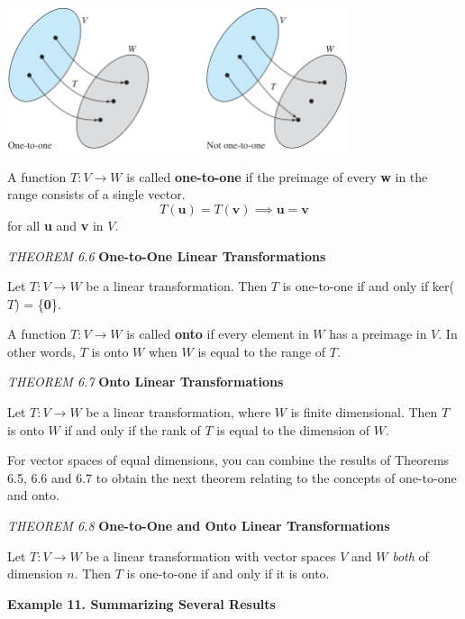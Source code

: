 \documentclass{article}
\begin{document}
    \begin{minipage}{0.61\linewidth}
            \includegraphics[width = 10cm]{images/1to1.png}    
    \end{minipage} \hfill
    \begin{minipage}{0.36\linewidth}
        A function $T: V \to W$ is called \textbf{one-to-one} if the preimage of every \textbf{w} in the range consists of a single
        vector.
        \[ T( \textbf{u} ) = T( \textbf{v} ) \implies \textbf{u} = \textbf{v} \]
        for all \textbf{u} and \textbf{v} in $V$.
    \end{minipage}
    \begin{tcolorbox}[colback = {blue9}]
        \textit{THEOREM 6.6} \textbf{One-to-One Linear Transformations}

        Let $T: V \to W$ be a linear transformation. Then $T$ is one-to-one if and only if ker($T$) = \{\textbf{0}\}.
    \end{tcolorbox}

    A function $T: V\to W$ is called \textbf{onto} if every element in $W$ has a preimage in $V$. In other words, $T$ is 
    onto $W$ when $W$ is equal to the range of $T$.
    \begin{tcolorbox}[colback = {blue9}]
        \textit{THEOREM 6.7} \textbf{Onto Linear Transformations}

        Let $T: V\to W$ be a linear transformation, where $W$ is finite dimensional. Then $T$ is onto $W$ if and only if
        the rank of $T$ is equal to the dimension of $W$.
    \end{tcolorbox}

    For vector spaces of equal dimensions, you can combine the results of Theorems 6.5, 6.6 and 6.7 to obtain
    the next theorem relating to the concepts of one-to-one and onto.
    \begin{tcolorbox}[colback = {blue9}]
        \textit{THEOREM 6.8} \textbf{One-to-One and Onto Linear Transformations}

        Let $T: V \to W$ be a linear transformation with vector spaces $V$ and $W$ \textit{both} of dimension $n$.
        Then $T$ is one-to-one if and only if it is onto.
    \end{tcolorbox}
    \textbf{Example 11. \textcolor{blue5}{Summarizing Several Results}}
\end{document}
